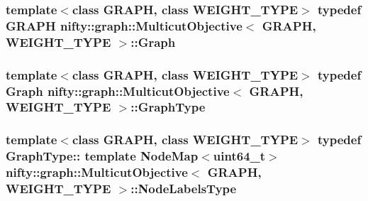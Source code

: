 \subsubsection[{Graph}]{\setlength{\rightskip}{0pt plus 5cm}template$<$class G\+R\+A\+P\+H, class W\+E\+I\+G\+H\+T\+\_\+\+T\+Y\+P\+E$>$ typedef G\+R\+A\+P\+H {\bf nifty\+::graph\+::\+Multicut\+Objective}$<$ G\+R\+A\+P\+H, W\+E\+I\+G\+H\+T\+\_\+\+T\+Y\+P\+E $>$\+::{\bf Graph}}\label{classnifty_1_1graph_1_1MulticutObjective_a041c561c434976179cbe5a3aebd4dac3}
\hypertarget{classnifty_1_1graph_1_1MulticutObjective_a8f0a93eb6756753344c8cce17a7ccafe}{}
\subsubsection[{Graph\+Type}]{\setlength{\rightskip}{0pt plus 5cm}template$<$class G\+R\+A\+P\+H, class W\+E\+I\+G\+H\+T\+\_\+\+T\+Y\+P\+E$>$ typedef {\bf Graph} {\bf nifty\+::graph\+::\+Multicut\+Objective}$<$ G\+R\+A\+P\+H, W\+E\+I\+G\+H\+T\+\_\+\+T\+Y\+P\+E $>$\+::{\bf Graph\+Type}}\label{classnifty_1_1graph_1_1MulticutObjective_a8f0a93eb6756753344c8cce17a7ccafe}
\hypertarget{classnifty_1_1graph_1_1MulticutObjective_ae262294d86c610298954474944613f63}{}
\subsubsection[{Node\+Labels\+Type}]{\setlength{\rightskip}{0pt plus 5cm}template$<$class G\+R\+A\+P\+H, class W\+E\+I\+G\+H\+T\+\_\+\+T\+Y\+P\+E$>$ typedef Graph\+Type\+:: template Node\+Map$<$uint64\+\_\+t$>$ {\bf nifty\+::graph\+::\+Multicut\+Objective}$<$ G\+R\+A\+P\+H, W\+E\+I\+G\+H\+T\+\_\+\+T\+Y\+P\+E $>$\+::{\bf Node\+Labels\+Type}}\label{classnifty_1_1graph_1_1MulticutObjective_ae262294d86c610298954474944613f63}
\hypertarget{classnifty_1_1graph_1_1MulticutObjective_a3c05717ad6cce1e8bc07ebbdb99480fe}{}
